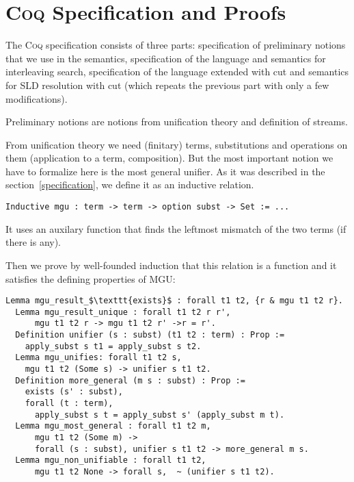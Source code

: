 \clearpage

\section{\textsc{Coq} Specification and Proofs}
\label{appendix_a}

The \textsc{Coq} specification consists of three parts: specification of preliminary notions that we use in the semantics, specification of the language and semantics for interleaving search, specification of the language extended with cut and semantics for SLD resolution with cut (which repeats the previous part with only a few modifications).

Preliminary notions are notions from unification theory and definition of streams.

From unification theory we need (finitary) terms, substitutions and operations on them (application to a term, composition). But the most important notion we have to formalize here is the most general unifier. As it was described in the section~\ref{specification}, we define it as an inductive relation.

\begin{lstlisting}[language=Coq]
  Inductive mgu : term -> term -> option subst -> Set := ...
\end{lstlisting}

It uses an auxilary function that finds the leftmost mismatch of the two terms (if there is any).

Then we prove by well-founded induction that this relation is a function and it satisfies the defining properties of MGU:

\begin{lstlisting}[language=Coq]
  Lemma mgu_result_$\texttt{exists}$ : forall t1 t2, {r & mgu t1 t2 r}.
  Lemma mgu_result_unique : forall t1 t2 r r',
      mgu t1 t2 r -> mgu t1 t2 r' ->r = r'.
  Definition unifier (s : subst) (t1 t2 : term) : Prop :=
    apply_subst s t1 = apply_subst s t2.
  Lemma mgu_unifies: forall t1 t2 s,
    mgu t1 t2 (Some s) -> unifier s t1 t2.
  Definition more_general (m s : subst) : Prop :=
    exists (s' : subst),
    forall (t : term),
      apply_subst s t = apply_subst s' (apply_subst m t).
  Lemma mgu_most_general : forall t1 t2 m,
      mgu t1 t2 (Some m) ->
      forall (s : subst), unifier s t1 t2 -> more_general m s.
  Lemma mgu_non_unifiable : forall t1 t2,
      mgu t1 t2 None -> forall s,  ~ (unifier s t1 t2).
\end{lstlisting}

